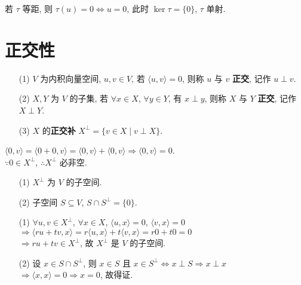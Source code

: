 \documentclass{note}
\begin{document}
若 $\tau$ 等距, 则 $\tau(u)=0\Longleftrightarrow u=0$, 此时 $\ker\tau=\{0\}$, $\tau$ 单射.

\section{正交性}
\begin{df}[正交]
    \begin{itemize}
        \item[(1)] $V$ 为内积向量空间, $u,v\in V$, 若 $\langle u,v\rangle=0$, 则称 $u$ 与 $v$ \textbf{正交}, 记作 $u\perp v$.
        \item[(2)] $X,Y$ 为 $V$ 的子集, 若 $\forall x\in X$, $\forall y\in Y$, 有 $x\perp y$, 则称 $X$ 与 $Y$ \textbf{正交}, 记作 $X\perp Y$.
        \item[(3)] $X$ 的\textbf{正交补} $X^{\perp}=\{v\in X\mid v\perp X\}$.
    \end{itemize}
\end{df}

$\langle 0,v\rangle=\langle 0+0,v\rangle=\langle 0,v\rangle+\langle 0,v\rangle\Longrightarrow\langle 0,v\rangle=0$.\\
$\because 0\in X^{\perp}$, $\therefore X^{\perp}$ 必非空.

\begin{thm}[(课本定理 9.7)]
    \begin{itemize}
        \item[(1)] $X^{\perp}$ 为 $V$ 的子空间.
        \item[(2)] 子空间 $S\subseteq V$, $S\cap S^{\perp}=\{0\}$.
    \end{itemize}
\end{thm}
\begin{pf}
    \begin{itemize}
        \item[(1)] $\forall u,v\in X^{\perp}$, $\forall x\in X$, $\langle u,x\rangle=0$, $\langle v,x\rangle=0$\\
        $\Longrightarrow\langle ru+tv,x\rangle=r\langle u,x\rangle+t\langle v,x\rangle=r0+t0=0$\\
        $\Longrightarrow ru+tv\in X^{\perp}$, 故 $X^{\perp}$ 是 $V$ 的子空间.
        \item[(2)] 设 $x\in S\cap S^{\perp}$, 则 $x\in S$ 且 $x\in S^{\perp}\Longleftrightarrow x\perp S\Longrightarrow x\perp x$\\
        $\Longrightarrow\langle x,x\rangle=0\Longrightarrow x=0$, 故得证.
    \end{itemize}
\end{pf}
\end{document}
